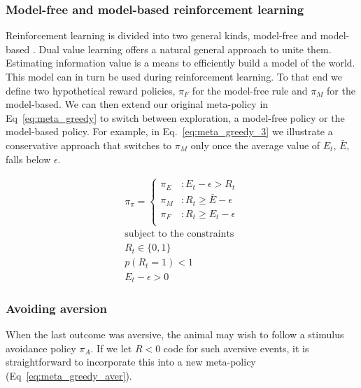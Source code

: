 \documentclass[9pt,twocolumn,twoside]{pnas-new}
\begin{document}
\subsubsection*{Model-free and model-based reinforcement learning}
Reinforcement learning is divided into two general kinds, model-free and model-based \cite{Sutton2018}. %
Dual value learning offers a natural general approach to unite them. Estimating information value is a means to efficiently build a model of the world. This model can in turn be used during reinforcement learning. To that end we define two hypothetical reward policies, $\pi_F$ for the model-free rule and $\pi_M$ for the model-based.  We can then extend our original meta-policy in Eq~\ref{eq:meta_greedy} to switch between exploration, a model-free policy or the model-based policy. For example, in Eq.~\ref{eq:meta_greedy_3} we illustrate a conservative approach that switches to $\pi_M$ only once the average value of $E_t$, $\bar E$, falls below $\epsilon$.

\begin{equation} \label{eq:meta_greedy_3}
    \begin{split}
        \pi_{\pi} = 
        \begin{cases}
            \pi_E & : E_t - \epsilon > R_t \\
            \pi_M & : R_t \geq \bar E - \epsilon \\
            \pi_F & : R_t \geq E_t - \epsilon \\
        \end{cases}\\
        \text{subject to the constraints}\\
        R_t \in \{0, 1\}\\ 
        p(R_t = 1) < 1\\
        E_t - \epsilon > 0
    \end{split}
\end{equation}


\subsubsection*{Avoiding aversion}
When the last outcome was aversive, the animal may wish to follow a stimulus avoidance policy $\pi_A$. If we let $R < 0$ code for such aversive events, it is straightforward to incorporate this into a new meta-policy (Eq~\ref{eq:meta_greedy_aver}).
\end{document}
